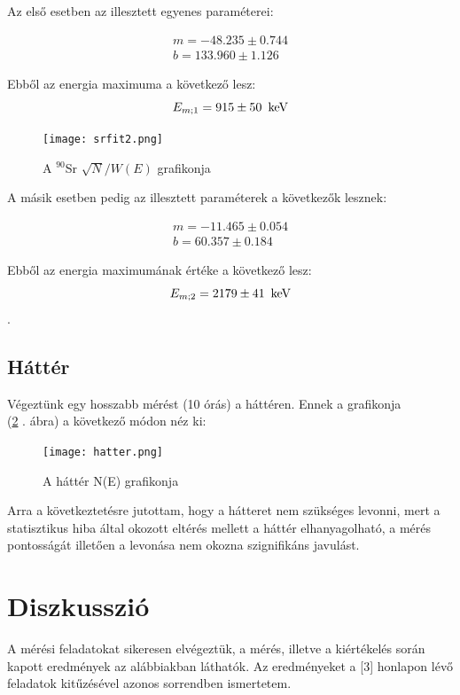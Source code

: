 \documentclass[12pt,a4paper]{article}
\begin{document}
Az első esetben az illesztett egyenes paraméterei:

\begin{equation*}
\begin{split}
m =-48.235 \pm 0.744\\
b = 133.960 \pm 1.126
\end{split}   
\end{equation*}

Ebből az energia maximuma a következő lesz: $$E_{m;1} = 915 \pm 50\hspace*{5pt} \mathrm{keV}$$
\begin{figure}[!h]
\centering
\texttt{[image: srfit2.png]}
\caption{A $^{90}$Sr $\sqrt{N}/W(E)$ grafikonja}
\label{fig:17}
\end{figure}
\newpage
A másik esetben pedig az illesztett paraméterek a következők lesznek: 

\begin{equation*}
\begin{split}
m = -11.465 \pm 0.054\\
b = 60.357 \pm 0.184
\end{split}   
\end{equation*}

Ebből az energia maximumának értéke a következő lesz: $$E_{m;2} = 2179 \pm 41\hspace*{5pt} \mathrm{keV}$$.
\subsection{Háttér}

Végeztünk egy hosszabb mérést (10 órás) a háttéren. Ennek a grafikonja\\ (\ref{fig:18} . ábra) a következő módon néz ki:

\begin{figure}[!h]
\centering
\texttt{[image: hatter.png]}
\caption{A háttér N(E) grafikonja}
\label{fig:18}
\end{figure}
Arra a következtetésre jutottam, hogy a hátteret nem szükséges levonni, mert a statisztikus hiba által okozott eltérés mellett a háttér elhanyagolható, a mérés pontosságát illetően a levonása nem okozna szignifikáns javulást.


\newpage

\section{Diszkusszió}
A mérési feladatokat sikeresen elvégeztük, a mérés, illetve a kiértékelés során kapott eredmények az alábbiakban láthatók. Az eredményeket a [3] honlapon lévő feladatok kitűzésével azonos sorrendben ismertetem.\newline
\end{document}
